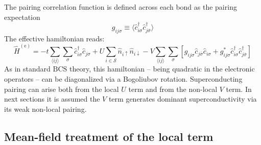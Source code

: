 The pairing correlation function is defined across each bond as the pairing expectation
\[
	g_{ij\sigma} \equiv \langle 
		\hat c_{i\sigma}^\dagger \hat c_{j \overline{\sigma}}^\dagger
	\rangle
\]
The effective hamiltonian reads:
\begin{equation}\label{eq:extended-hubbard-model-effective-intermediate-2}
	\hat H^{(\mathrm{e})} =
	-t \sum_{\langle ij \rangle} \sum_\sigma \hat c_{i\sigma}^\dagger \hat c_{j\sigma}
	+ U \sum_{i \in \mathcal{S}} \hat n_{i\uparrow} \hat n_{i\downarrow}
	- V \sum_{\langle ij \rangle} \sum_\sigma \left[
		g_{ij\sigma} \hat c_{j\overline{\sigma}} \hat c_{i\sigma} + g_{ij\sigma}^* \hat c_{i\sigma}^\dagger \hat c_{j\overline{\sigma}}^\dagger
	\right]
\end{equation}
As in standard $\mathrm{BCS}$ theory, this hamiltonian -- being quadratic in the electronic operators -- can be diagonalized via a Bogoliubov rotation. Superconducting pairing can arise both from the local $U$ term and from the non-local $V$ term. In next sections it is assumed the $V$ term generates dominant superconductivity via its weak non-local pairing.

\subsection{Mean-field treatment of the local term}

